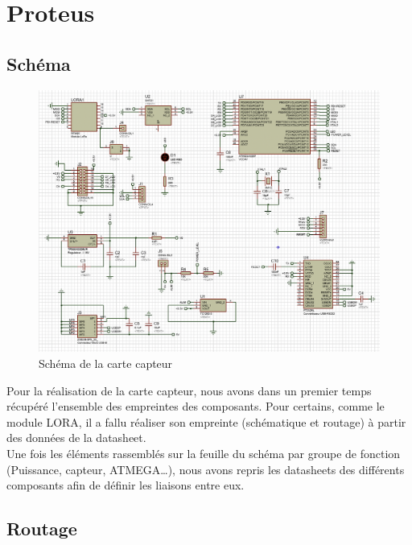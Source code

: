 \chapter{Proteus}

    \section{Schéma}

        \begin{figure}[!h]
            \begin{center}
                \includegraphics[width=1\textwidth]{img/proteus/schema.png}
                \caption{\label{fig:schema}Schéma de la carte capteur}  
            \end{center}  
        \end{figure}

        Pour la réalisation de la carte capteur, nous avons dans un premier temps récupéré l’ensemble des empreintes des composants. Pour certains, comme le module LORA, il a fallu réaliser son empreinte 
        (schématique et routage) à partir des données de la datasheet. \\
        Une fois les éléments rassemblés sur la feuille du schéma par groupe de fonction (Puissance, capteur, ATMEGA…), nous avons repris les datasheets des différents composants afin de définir les liaisons entre eux.

        

    \clearpage
    \section{Routage}

